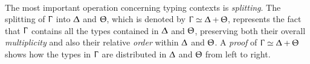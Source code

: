 \begin{code}%
\>[0]\AgdaSpace{}%
\AgdaSymbol{:}\AgdaSpace{}%
\<%
\\
\>[0]\AgdaSpace{}%
\AgdaSymbol{=}\AgdaSpace{}%
\AgdaSpace{}%
\<%
\end{code}

The most important operation concerning typing contexts is \emph{splitting}. The
splitting of $\Upgamma$ into $\Updelta$ and $\Uptheta$, which is denoted by
$\Upgamma \simeq \Updelta + \Uptheta$, represents the fact that $\Upgamma$
contains all the types contained in $\Updelta$ and $\Uptheta$, preserving both
their overall \emph{multiplicity} and also their relative \emph{order} within
$\Updelta$ and $\Uptheta$. A \emph{proof} of
$\Upgamma \simeq \Updelta + \Uptheta$ shows how the types in $\Upgamma$ are
distributed in $\Updelta$ and $\Uptheta$ from left to right.

